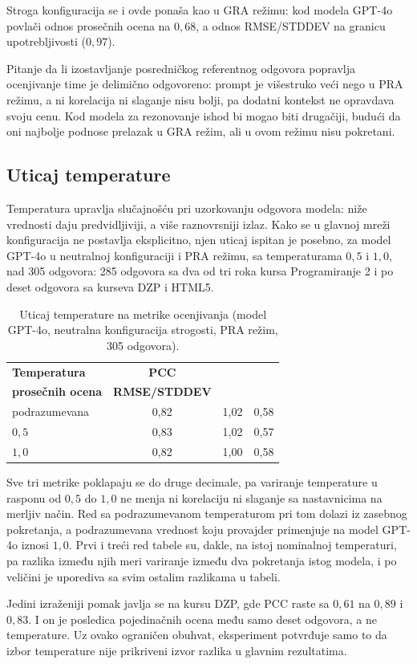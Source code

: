 Stroga konfiguracija se i ovde ponaša kao u GRA režimu:
kod modela GPT-4o povlači odnos prosečnih ocena na $0{,}68$, a odnos RMSE/STDDEV na granicu upotrebljivosti ($0{,}97$).

Pitanje da li izostavljanje posredničkog referentnog odgovora popravlja ocenjivanje time je delimično odgovoreno:
prompt je višestruko veći nego u PRA režimu, a ni korelacija ni slaganje nisu bolji,
pa dodatni kontekst ne opravdava svoju cenu.
Kod modela za rezonovanje ishod bi mogao biti drugačiji,
budući da oni najbolje podnose prelazak u GRA režim,
ali u ovom režimu nisu pokretani.

\subsection{Uticaj temperature}
\label{sec:rezultati-temperatura}

Temperatura upravlja slučajnošću pri uzorkovanju odgovora modela:
niže vrednosti daju predvidljiviji, a više raznovrsniji izlaz.
Kako se u glavnoj mreži konfiguracija ne postavlja eksplicitno,
njen uticaj ispitan je posebno, za model GPT-4o u neutralnoj konfiguraciji i PRA režimu,
sa temperaturama $0{,}5$ i $1{,}0$,
nad 305 odgovora: 285 odgovora sa dva od tri roka kursa Programiranje 2
i po deset odgovora sa kurseva DZP i HTML5.

\begin{table}[ht]
\centering
\caption{Uticaj temperature na metrike ocenjivanja
(model GPT-4o, neutralna konfiguracija strogosti, PRA režim, 305 odgovora).}
\label{tab:temperatura}
\begin{tabular}{lccc}
\toprule
\textbf{Temperatura} & \textbf{PCC} & \makecell{\textbf{Odnos}\\\textbf{prosečnih ocena}} & \textbf{RMSE/STDDEV} \\
\midrule
podrazumevana & 0{,}82 & 1{,}02 & 0{,}58 \\
$0{,}5$       & 0{,}83 & 1{,}02 & 0{,}57 \\
$1{,}0$       & 0{,}82 & 1{,}00 & 0{,}58 \\
\bottomrule
\end{tabular}
\end{table}

Sve tri metrike poklapaju se do druge decimale,
pa variranje temperature u rasponu od $0{,}5$ do $1{,}0$ ne menja ni korelaciju ni slaganje sa nastavnicima na merljiv način.
Red sa podrazumevanom temperaturom pri tom dolazi iz zasebnog pokretanja,
a podrazumevana vrednost koju provajder primenjuje na model GPT-4o iznosi $1{,}0$.
Prvi i treći red tabele su, dakle, na istoj nominalnoj temperaturi,
pa razlika između njih meri variranje između dva pokretanja istog modela,
i po veličini je uporediva sa svim ostalim razlikama u tabeli.

Jedini izraženiji pomak javlja se na kursu DZP, gde PCC raste sa $0{,}61$ na $0{,}89$ i $0{,}83$.
I on je posledica pojedinačnih ocena među samo deset odgovora, a ne temperature.
Uz ovako ograničen obuhvat, eksperiment potvrđuje samo to da izbor temperature
nije prikriveni izvor razlika u glavnim rezultatima.
